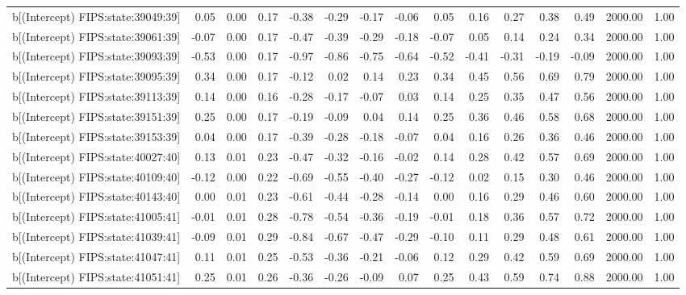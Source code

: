 \begin{table}[ht]
\begin{tabular}{rrrrrrrrrrrrrrr}
  b[(Intercept) FIPS:state:39049:39] & 0.05 & 0.00 & 0.17 & -0.38 & -0.29 & -0.17 & -0.06 & 0.05 & 0.16 & 0.27 & 0.38 & 0.49 & 2000.00 & 1.00 \\ 
  b[(Intercept) FIPS:state:39061:39] & -0.07 & 0.00 & 0.17 & -0.47 & -0.39 & -0.29 & -0.18 & -0.07 & 0.05 & 0.14 & 0.24 & 0.34 & 2000.00 & 1.00 \\ 
  b[(Intercept) FIPS:state:39093:39] & -0.53 & 0.00 & 0.17 & -0.97 & -0.86 & -0.75 & -0.64 & -0.52 & -0.41 & -0.31 & -0.19 & -0.09 & 2000.00 & 1.00 \\ 
  b[(Intercept) FIPS:state:39095:39] & 0.34 & 0.00 & 0.17 & -0.12 & 0.02 & 0.14 & 0.23 & 0.34 & 0.45 & 0.56 & 0.69 & 0.79 & 2000.00 & 1.00 \\ 
  b[(Intercept) FIPS:state:39113:39] & 0.14 & 0.00 & 0.16 & -0.28 & -0.17 & -0.07 & 0.03 & 0.14 & 0.25 & 0.35 & 0.47 & 0.56 & 2000.00 & 1.00 \\ 
  b[(Intercept) FIPS:state:39151:39] & 0.25 & 0.00 & 0.17 & -0.19 & -0.09 & 0.04 & 0.14 & 0.25 & 0.36 & 0.46 & 0.58 & 0.68 & 2000.00 & 1.00 \\ 
  b[(Intercept) FIPS:state:39153:39] & 0.04 & 0.00 & 0.17 & -0.39 & -0.28 & -0.18 & -0.07 & 0.04 & 0.16 & 0.26 & 0.36 & 0.46 & 2000.00 & 1.00 \\ 
  b[(Intercept) FIPS:state:40027:40] & 0.13 & 0.01 & 0.23 & -0.47 & -0.32 & -0.16 & -0.02 & 0.14 & 0.28 & 0.42 & 0.57 & 0.69 & 2000.00 & 1.00 \\ 
  b[(Intercept) FIPS:state:40109:40] & -0.12 & 0.00 & 0.22 & -0.69 & -0.55 & -0.40 & -0.27 & -0.12 & 0.02 & 0.15 & 0.30 & 0.46 & 2000.00 & 1.00 \\ 
  b[(Intercept) FIPS:state:40143:40] & 0.00 & 0.01 & 0.23 & -0.61 & -0.44 & -0.28 & -0.14 & 0.00 & 0.16 & 0.29 & 0.46 & 0.60 & 2000.00 & 1.00 \\ 
  b[(Intercept) FIPS:state:41005:41] & -0.01 & 0.01 & 0.28 & -0.78 & -0.54 & -0.36 & -0.19 & -0.01 & 0.18 & 0.36 & 0.57 & 0.72 & 2000.00 & 1.00 \\ 
  b[(Intercept) FIPS:state:41039:41] & -0.09 & 0.01 & 0.29 & -0.84 & -0.67 & -0.47 & -0.29 & -0.10 & 0.11 & 0.29 & 0.48 & 0.61 & 2000.00 & 1.00 \\ 
  b[(Intercept) FIPS:state:41047:41] & 0.11 & 0.01 & 0.25 & -0.53 & -0.36 & -0.21 & -0.06 & 0.12 & 0.29 & 0.42 & 0.59 & 0.69 & 2000.00 & 1.00 \\ 
  b[(Intercept) FIPS:state:41051:41] & 0.25 & 0.01 & 0.26 & -0.36 & -0.26 & -0.09 & 0.07 & 0.25 & 0.43 & 0.59 & 0.74 & 0.88 & 2000.00 & 1.00 \\ 

\end{tabular}
\end{table}
